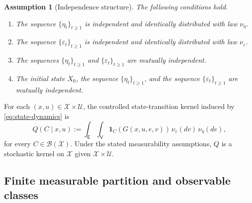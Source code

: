 \documentclass[10pt,twocolumn]{article}
\newtheorem{assumption}{Assumption}
\theoremstyle{remark}
\newcommand{\B}{\mathcal{B}}
\newcommand{\Ucal}{\mathcal{U}}
\newcommand{\Xcal}{\mathcal{X}}
\newcommand{\one}{\mathbf{1}}
\begin{document}
\begin{assumption}[Independence structure]
\label{ass:independence}
The following conditions hold.
\begin{enumerate}[label=\textnormal{(I\arabic*)},leftmargin=*]
    \item The sequence $\{\eta_t\}_{t\geq 1}$ is independent and identically distributed with law $\nu_\eta$.
    \item The sequence $\{\varepsilon_t\}_{t\geq 1}$ is independent and identically distributed with law $\nu_\varepsilon$.
    \item The sequences $\{\eta_t\}_{t\geq 1}$ and $\{\varepsilon_t\}_{t\geq 1}$ are mutually independent.
    \item The initial state $X_0$, the sequence $\{\eta_t\}_{t\geq 1}$, and the sequence $\{\varepsilon_t\}_{t\geq 1}$ are mutually independent.
\end{enumerate}
\end{assumption}

For each $(x,u)\in\Xcal\times\Ucal$, the controlled state-transition kernel induced by \cref{eq:state-dynamics} is
\begin{equation*}
Q(C\mid x,u)
:=
\int_{\mathsf E}\int_{\mathsf V}
\one_C\!\left(G(x,u,e,v)\right)
\,\nu_\varepsilon(dv)\,\nu_\eta(de),
\label{eq:controlled-kernel}
\end{equation*}
for every $C\in\B(\Xcal)$. Under the stated measurability assumptions, $Q$ is a stochastic kernel on $\Xcal$ given $\Xcal\times\Ucal$.


\subsection{Finite measurable partition and observable classes}
\label{subsec:partition}
\end{document}
